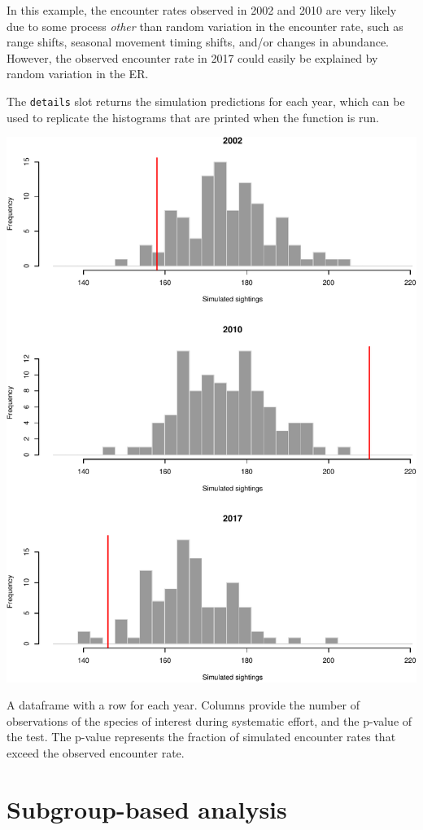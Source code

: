 \documentclass[
]{book}
\begin{document}
In this example, the encounter rates observed in 2002 and 2010 are very likely due to some process \emph{other} than random variation in the encounter rate, such as range shifts, seasonal movement timing shifts, and/or changes in abundance. However, the observed encounter rate in 2017 could easily be explained by random variation in the ER.

The \texttt{details} slot returns the simulation predictions for each year, which can be used to replicate the histograms that are printed when the function is run.

\includegraphics{figures/unnamed-chunk-213-1.pdf}

A dataframe with a row for each year. Columns provide the number of observations of the species of interest during systematic effort, and the p-value of the test. The p-value represents the fraction of simulated encounter rates that exceed the observed encounter rate.

\hypertarget{subgroup-based-analysis}{%
\chapter{Subgroup-based analysis}\label{subgroup-based-analysis}}
\end{document}
